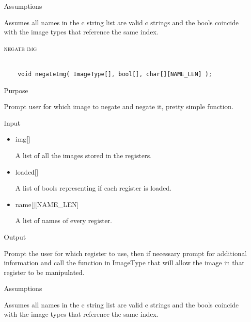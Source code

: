 \documentclass[pdftex, 11pt]{article}
\begin{document}
\begin{description}
\begin{description}
			\item{Assumptions}

				Assumes all names in the c string list are valid c
				strings and the bools coincide with the image types that
				reference the same index.

		\end{description}



	\item{\textsc{negate img}}

		\begin{lstlisting}

	void negateImg( ImageType[], bool[], char[][NAME_LEN] );
		\end{lstlisting}

		\begin{description}
			\item{Purpose}

				Prompt user for which image to negate and negate it, pretty simple function.

			\item{Input}

				\begin{itemize}

					\item{img[]}

						A list of all the images stored in the registers.

					\item{loaded[]}

						A list of bools representing if each register is loaded.

					\item{name[][NAME\_LEN]}

						A list of names of every register.

				\end{itemize}

			\item{Output}

				Prompt the user for which register to use, then if necessary
				prompt for additional information and call the function
				in ImageType that will allow the image in that register to
				be manipulated.

			\item{Assumptions}

				Assumes all names in the c string list are valid c
				strings and the bools coincide with the image types that
				reference the same index.


\end{description}
\end{description}
\end{document}
